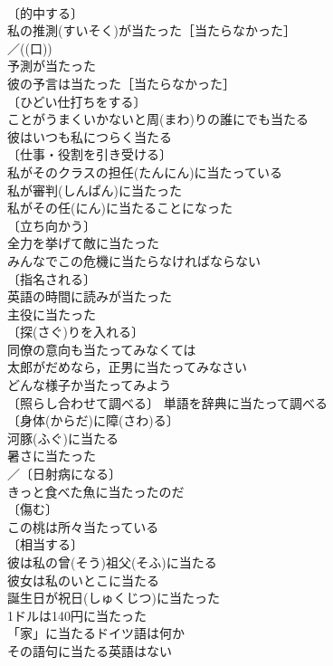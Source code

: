 \documentclass[8pt]{extreport}
\begin{document}
\begin{CJK}{UTF8}{min}
\\	〔的中する〕
\\	私の推測(すいそく)が当たった［当たらなかった］ 
\\	／((口)) 
\\	予測が当たった 
\\	彼の予言は当たった［当たらなかった］ 
\\	〔ひどい仕打ちをする〕 
\\	ことがうまくいかないと周(まわ)りの誰にでも当たる 
\\	彼はいつも私につらく当たる 
\\	〔仕事・役割を引き受ける〕
\\	私がそのクラスの担任(たんにん)に当たっている 
\\	私が審判(しんぱん)に当たった 
\\	私がその任(にん)に当たることになった 
\\	〔立ち向かう〕
\\	全力を挙げて敵に当たった 
\\	みんなでこの危機に当たらなければならない 
\\	〔指名される〕 
\\	英語の時間に読みが当たった 
\\	主役に当たった 
\\	〔探(さぐ)りを入れる〕 
\\	同僚の意向も当たってみなくては 
\\	太郎がだめなら，正男に当たってみなさい 
\\	どんな様子か当たってみよう 
\\	〔照らし合わせて調べる〕 単語を辞典に当たって調べる 
\\	〔身体(からだ)に障(さわ)る〕
\\	河豚(ふぐ)に当たる 
\\	暑さに当たった 
\\	／〔日射病になる〕
\\	きっと食べた魚に当たったのだ 
\\	〔傷む〕 
\\	この桃は所々当たっている 
\\	〔相当する〕
\\	彼は私の曾(そう)祖父(そふ)に当たる 
\\	彼女は私のいとこに当たる 
\\	誕生日が祝日(しゅくじつ)に当たった 
\\	1ドルは140円に当たった 
\\	「家」に当たるドイツ語は何か 
\\	その語句に当たる英語はない 

\end{CJK}
\end{document}

